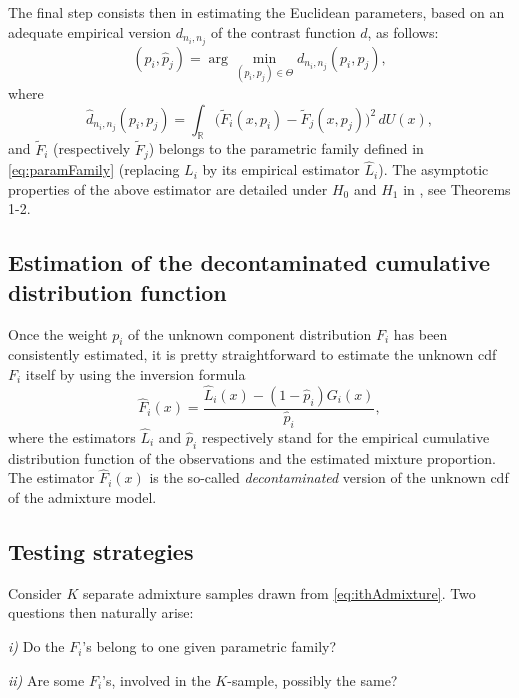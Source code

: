 The final step consists then in estimating the Euclidean parameters, based on an adequate empirical version \(d_{n_i,n_j}\) of the contrast function \(d\), as follows:
\begin{equation}
  (\hat{p}_{i}, \hat{p}_{j}) = \arg\min_{(p_i,p_j)\in \Theta} d_{n_i,n_j}(p_i,p_j),
\label{eq:contratEmpIBM}
\end{equation}
where
\[
  \hat d_{n_i,n_j}(p_i,p_j) = \int_{\mathbb{R}} \big(\tilde F_i(x,p_i) - \tilde F_j(x,p_j)\big)^2 \, dU(x),
\]
and \(\tilde F_i\) (respectively \(\tilde F_j\)) belongs to the parametric family defined in \eqref{eq:paramFamily} (replacing \(L_i\) by its empirical estimator \(\hat{L}_i\)). The asymptotic properties of the above estimator are detailed under \(H_0\) and \(H_1\) in \citet{Milhaud+Pommeret+Salhi+Vandekerkhove:2023}, see Theorems 1-2.

\subsection{Estimation of the decontaminated cumulative distribution function}\label{sec:decontamine}

Once the weight \(p_i\) of the unknown component distribution \(F_i\) has been consistently estimated, it is pretty straightforward to estimate the unknown cdf \(F_i\) itself by using the inversion formula\\
\begin{equation}
  \hat{F}_i(x) = \frac{\hat{L}_i(x) - (1-\hat{p}_i)G_i(x)}{\hat{p}_i},
\label{eq:decontaminatedCDF}
\end{equation}
where the estimators \(\hat{L}_i\) and \(\hat{p}_i\) respectively stand for the empirical cumulative distribution function of the observations and the estimated mixture proportion. The estimator \(\hat{F}_i(x)\) is the so-called \emph{decontaminated} version of the unknown cdf of the admixture model.

\subsection{Testing strategies}\label{sec:testingMeth}

Consider \(K\) separate admixture samples drawn from \eqref{eq:ithAdmixture}. Two questions then naturally arise:

\emph{i)} Do the \(F_i\)'s belong to one given parametric family?

\emph{ii)} Are some \(F_i\)'s, involved in the \(K\)-sample, possibly the same?

